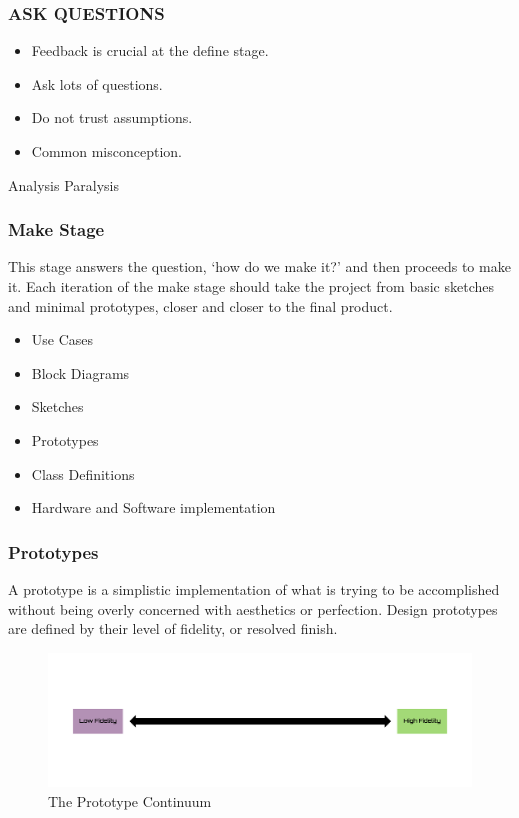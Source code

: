\begin{frame}
	\frametitle{\textbf{ASK QUESTIONS}}
	\begin{itemize}
		\item Feedback is crucial at the define stage. 
		\item Ask lots of questions.
		\item Do not trust assumptions. 
		\item Common misconception.
	\end{itemize}
\end{frame}

\begin{frame}
	\begin{center}
		\Huge{Analysis Paralysis }
	\end{center}
\end{frame}


\begin{frame}
	\frametitle{Make Stage}
	This stage answers the question, `how do we make it?' and then proceeds to make it. Each iteration of the make stage should take the project from basic sketches and minimal prototypes, closer and closer to the final product. 
	
\pause
	\begin{itemize}
		\item Use Cases
		\item Block Diagrams 
		\item Sketches				
		\item Prototypes
		\item Class Definitions
		\item Hardware and Software implementation   		
	\end{itemize}
\end{frame}

\begin{frame}
	\frametitle{Prototypes}
	A prototype is a simplistic implementation of what is trying to be accomplished without being overly concerned with aesthetics or perfection. Design prototypes are defined by their level of fidelity, or resolved finish. 
	\begin{figure}
		\includegraphics[scale=0.23]{assets/prototype.png}
		\caption{The Prototype Continuum}
	\end{figure}
\end{frame}



